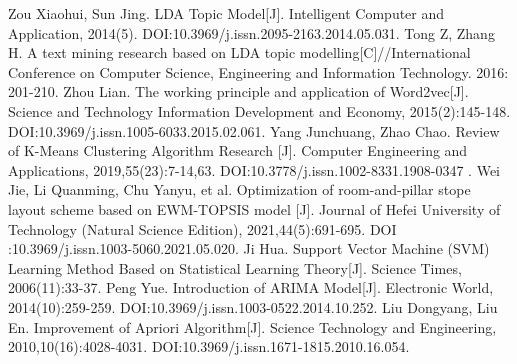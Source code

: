 \documentclass[12pt]{article}
\begin{document}
	
	
	
	
	
	
	
	
	
	
	


	
	
	
	
    \addtocounter{section}{1}
	\begin{thebibliography}{99}
		 Zou Xiaohui, Sun Jing. LDA Topic Model[J]. Intelligent Computer and Application, 2014(5). DOI:10.3969/j.issn.2095-2163.2014.05.031.
		 Tong Z, Zhang H. A text mining research based on LDA topic modelling[C]//International Conference on Computer Science, Engineering and Information Technology. 2016: 201-210.
		  Zhou Lian. The working principle and application of Word2vec[J]. Science and Technology Information Development and Economy, 2015(2):145-148. DOI:10.3969/j.issn.1005-6033.2015.02.061.
         Yang Junchuang, Zhao Chao. Review of K-Means Clustering Algorithm Research [J]. Computer Engineering and Applications, 2019,55(23):7-14,63. DOI:10.3778/j.issn.1002-8331.1908-0347 .
         Wei Jie, Li Quanming, Chu Yanyu, et al. Optimization of room-and-pillar stope layout scheme based on EWM-TOPSIS model [J]. Journal of Hefei University of Technology (Natural Science Edition), 2021,44(5):691-695. DOI :10.3969/j.issn.1003-5060.2021.05.020.
         Ji Hua. Support Vector Machine (SVM) Learning Method Based on Statistical Learning Theory[J]. Science Times, 2006(11):33-37.
         Peng Yue. Introduction of ARIMA Model[J]. Electronic World, 2014(10):259-259. DOI:10.3969/j.issn.1003-0522.2014.10.252.
         Liu Dongyang, Liu En. Improvement of Apriori Algorithm[J]. Science Technology and Engineering, 2010,10(16):4028-4031. DOI:10.3969/j.issn.1671-1815.2010.16.054.
	\end{thebibliography}
\end{document}
